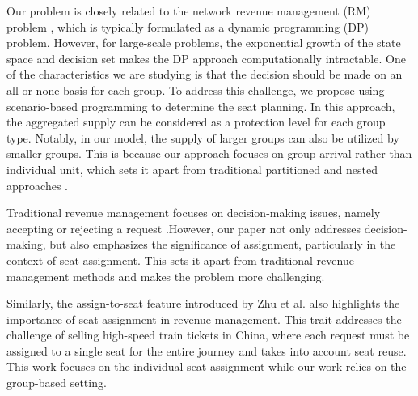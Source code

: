 Our problem is closely related to the network revenue management (RM) problem \cite{williamson1992airline}, which is typically formulated as a dynamic programming (DP) problem. However, for large-scale problems, the exponential growth of the state space and decision set makes the DP approach computationally intractable. One of the characteristics we are studying is that the decision should be made on an all-or-none basis for each group. To address this challenge, we propose using scenario-based programming \cite{feng2013scenario, casey2005scenario, henrion2018problem} to determine the seat planning. In this approach, the aggregated supply can be considered as a protection level for each group type. Notably, in our model, the supply of larger groups can also be utilized by smaller groups. This is because our approach focuses on group arrival rather than individual unit, which sets it apart from traditional partitioned and nested approaches \cite{curry1990optimal, van2008simulation}.



Traditional revenue management focuses on decision-making issues, namely accepting or rejecting a request \cite{gallego1997multiproduct}.However, our paper not only addresses decision-making, but also emphasizes the significance of assignment, particularly in the context of seat assignment. This sets it apart from traditional revenue management methods and makes the problem more challenging.

Similarly, the assign-to-seat feature introduced by Zhu et al. \cite{zhu2023assign} also highlights the importance of seat assignment in revenue management. This trait addresses the challenge of selling high-speed train tickets in China, where each request must be assigned to a single seat for the entire journey and takes into account seat reuse. This work focuses on the individual seat assignment while our work relies on the group-based setting.





